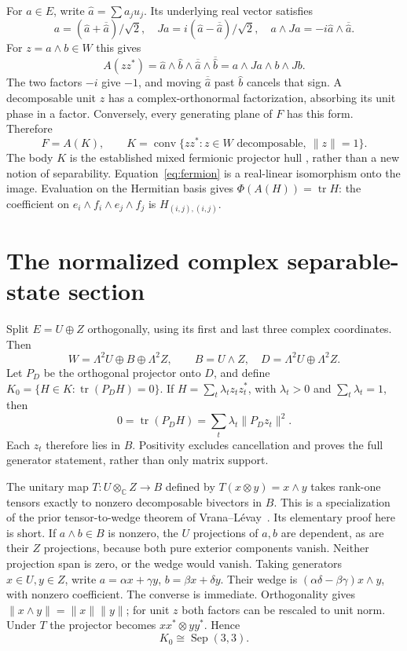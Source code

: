 \documentclass[11pt]{article}
\newcommand{\conv}{\operatorname{conv}}
\newcommand{\tr}{\operatorname{tr}}
\newcommand{\Sep}{\operatorname{Sep}}
\begin{document}
For $a\in E$, write $\widehat a=\sum a_j u_j$. Its underlying real vector
satisfies
\[
 a=(\widehat a+\overline{\widehat a})/\sqrt2,\quad
 Ja=i(\widehat a-\overline{\widehat a})/\sqrt2,\quad
 a\wedge Ja=-i\widehat a\wedge\overline{\widehat a}.
\]
For $z=a\wedge b\in W$ this gives
\begin{equation}\label{eq:projector}
 A(zz^*)=\widehat a\wedge\widehat b\wedge
           \overline{\widehat a}\wedge\overline{\widehat b}
        =a\wedge Ja\wedge b\wedge Jb.
\end{equation}
The two factors $-i$ give $-1$, and moving $\overline{\widehat a}$ past
$\widehat b$ cancels that sign. A decomposable unit $z$ has a
complex-orthonormal factorization, absorbing its unit phase in a factor.
Conversely, every generating plane of $F$ has this form. Therefore
\begin{equation}\label{eq:fermion}
 F=A(K),\qquad
 K=\conv\{zz^*:z\in W\text{ decomposable},\ \|z\|=1\}.
\end{equation}
The body $K$ is the established mixed fermionic projector hull
\cite[Definition 4.2 and Theorem 5.1]{fermion}, rather than a new notion of
separability. Equation~\eqref{eq:fermion} is a real-linear isomorphism onto
the image. Evaluation on the Hermitian basis gives
$\Phi(A(H))=\tr H$: the coefficient on
$e_i\wedge f_i\wedge e_j\wedge f_j$ is $H_{(i,j),(i,j)}$.

\section{The normalized complex separable-state section}
Split $E=U\oplus Z$ orthogonally, using its first and last three complex
coordinates. Then
\[
 W=\Lambda^2U\oplus B\oplus\Lambda^2Z,
 \qquad B=U\wedge Z,\quad D=\Lambda^2U\oplus\Lambda^2Z.
\]
Let $P_D$ be the orthogonal projector onto $D$, and define
$K_0=\{H\in K:\tr(P_DH)=0\}$. If
$H=\sum_t\lambda_t z_tz_t^*$, with $\lambda_t>0$ and $\sum_t\lambda_t=1$,
then
\[
 0=\tr(P_DH)=\sum_t\lambda_t\|P_Dz_t\|^2.
\]
Each $z_t$ therefore lies in $B$. Positivity excludes cancellation and
proves the full generator statement, rather than only matrix support.

The unitary map $T:U\otimes_{\mathbb C}Z\to B$ defined by
$T(x\otimes y)=x\wedge y$ takes rank-one tensors exactly to nonzero
decomposable bivectors in $B$. This is a specialization of the prior
tensor-to-wedge theorem of Vrana--L\'evay~\cite[\S3.1, equation (25)]{vrana}.
Its elementary proof here is short. If $a\wedge b\in B$ is nonzero, the
$U$ projections of $a,b$ are dependent, as are their $Z$ projections,
because both pure exterior components vanish. Neither projection span
is zero, or the wedge would vanish. Taking generators $x\in U,y\in Z$,
write $a=\alpha x+\gamma y$, $b=\beta x+\delta y$. Their wedge is
$(\alpha\delta-\beta\gamma)x\wedge y$, with nonzero coefficient.
The converse is immediate. Orthogonality gives
$\|x\wedge y\|=\|x\|\|y\|$; for unit $z$ both factors can be rescaled to
unit norm. Under $T$ the projector becomes $xx^*\otimes yy^*$. Hence
\begin{equation}\label{eq:section}
 K_0\cong\Sep(3,3).
\end{equation}
\end{document}
